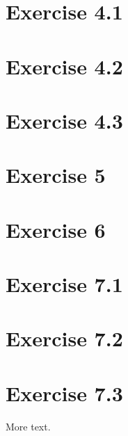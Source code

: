 \documentclass[11pt]{article} %
\begin{document}
\section*{Exercise 4.1}

\section*{Exercise 4.2}

\section*{Exercise 4.3}

\section*{Exercise 5}

\section*{Exercise 6}

\section*{Exercise 7.1}

\section*{Exercise 7.2}

\section*{Exercise 7.3}

More text.
\end{document}
